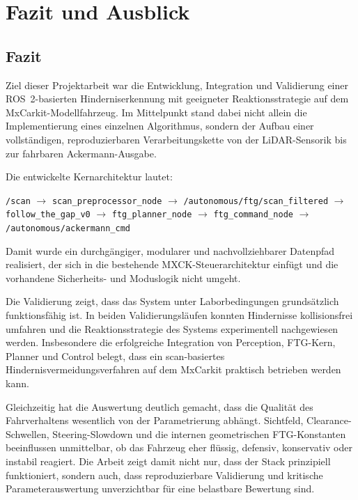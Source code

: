 \chapter{Fazit und Ausblick}
\label{ch:fazit}

\section{Fazit}

Ziel dieser Projektarbeit war die Entwicklung, Integration und Validierung einer ROS~2-basierten Hinderniserkennung mit geeigneter Reaktionsstrategie auf dem MxCarkit-Modellfahrzeug. Im Mittelpunkt stand dabei nicht allein die Implementierung eines einzelnen Algorithmus, sondern der Aufbau einer vollständigen, reproduzierbaren Verarbeitungskette von der LiDAR-Sensorik bis zur fahrbaren Ackermann-Ausgabe.

Die entwickelte Kernarchitektur lautet:

\begin{center}
\texttt{/scan}
$\rightarrow$
\texttt{scan\_preprocessor\_node}
$\rightarrow$
\texttt{/autonomous/ftg/scan\_filtered}
$\rightarrow$
\texttt{follow\_the\_gap\_v0}
$\rightarrow$
\texttt{ftg\_planner\_node}
$\rightarrow$
\texttt{ftg\_command\_node}
$\rightarrow$
\texttt{/autonomous/ackermann\_cmd}
\end{center}

Damit wurde ein durchgängiger, modularer und nachvollziehbarer Datenpfad realisiert, der sich in die bestehende MXCK-Steuerarchitektur einfügt und die vorhandene Sicherheits- und Moduslogik nicht umgeht.

Die Validierung zeigt, dass das System unter Laborbedingungen grundsätzlich funktionsfähig ist. In beiden Validierungsläufen konnten Hindernisse kollisionsfrei umfahren und die Reaktionsstrategie des Systems experimentell nachgewiesen werden. Insbesondere die erfolgreiche Integration von Perception, FTG-Kern, Planner und Control belegt, dass ein scan-basiertes Hindernisvermeidungsverfahren auf dem MxCarkit praktisch betrieben werden kann.

Gleichzeitig hat die Auswertung deutlich gemacht, dass die Qualität des Fahrverhaltens wesentlich von der Parametrierung abhängt. Sichtfeld, Clearance-Schwellen, Steering-Slowdown und die internen geometrischen FTG-Konstanten beeinflussen unmittelbar, ob das Fahrzeug eher flüssig, defensiv, konservativ oder instabil reagiert. Die Arbeit zeigt damit nicht nur, dass der Stack prinzipiell funktioniert, sondern auch, dass reproduzierbare Validierung und kritische Parameterauswertung unverzichtbar für eine belastbare Bewertung sind.

